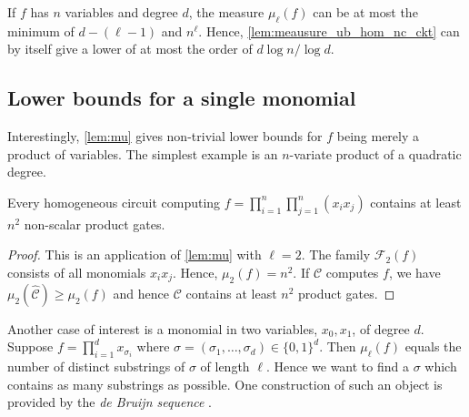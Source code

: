 \documentclass[10pt,a4paper]{article}
\newcommand{\ckt}{\textbf{$\mathcal{C}$}}
\renewcommand{\fam}{\textbf{$\mathcal{F}$}}
\begin{document}
\begin{remark} 
  If $f$ has $n$ variables and degree $d$, the measure $\mu_\ell(f)$ can be at most the minimum of $d- (\ell-1)$ and $n^\ell$. 
  Hence, \autoref{lem:meausure_ub_hom_nc_ckt} can by itself give a lower of at most the order of $d\log n/\log d$. %
\end{remark}


\subsection{Lower bounds for a single monomial}\label{sec:monomial}
Interestingly, \autoref{lem:mu} gives non-trivial lower bounds for $f$ being merely a product of variables. 
The simplest example is an $n$-variate product of a quadratic degree.

\begin{proposition} 
  Every homogeneous circuit computing $f=\prod_{i=1}^n\prod_{j=1}^n (x_ix_j)$ contains at least $n^2$ non-scalar product gates. 
\end{proposition}

\begin{proof} 
  This is an application of \autoref{lem:mu} with $\ell=2$. 
  The family $\fam_2(f)$ consists of all monomials $x_ix_j$. 
  Hence, $\mu_2(f)=n^2$. If $\ckt$ computes $f$, we have $\mu_2(\widehat {\ckt})\geq \mu_2(f)$ and hence $\ckt$ contains at least $n^2$ product gates.
\end{proof}

Another case of interest is a monomial in two variables, $x_0,x_1$, of degree $d$. 
Suppose $f= \prod_{i=1}^d x_{\sigma_i} $ where $\sigma= ( \sigma_1,\dots, \sigma_d)\in \{0,1\}^d $. 
Then $\mu_\ell(f)$ equals the number of distinct substrings of $\sigma$ of length $\ell$. 
Hence we want to find a $\sigma$ which contains as many substrings as possible. 
One construction of such an object is provided by the \emph{de Bruijn sequence} \cite{dB46}.
\end{document}
